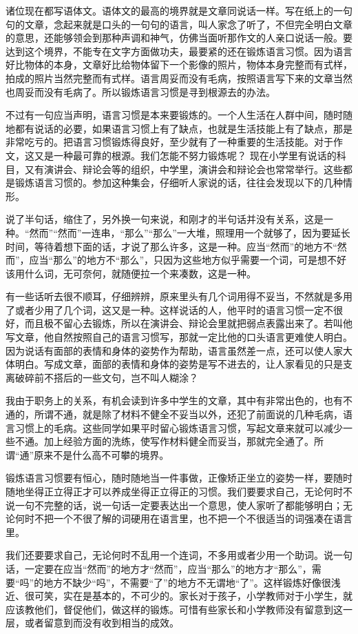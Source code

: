 \documentclass[fontset=fandol,12pt,a5paper]{ctexbook}
\begin{document}
诸位现在都写语体文。语体文的最高的境界就是文章同说话一样。写在纸上的一句句的文章，念起来就是口头的一句句的语言，叫人家念了听了，不但完全明白文章的意思，还能够领会到那种声调和神气，仿佛当面听那作文的人亲口说话一般。要达到这个境界，不能专在文字方面做功夫，最要紧的还在锻炼语言习惯。因为语言好比物体的本身，文章好比给物体留下一个影像的照片，物体本身完整而有式样，拍成的照片当然完整而有式样。语言周妥而没有毛病，按照语言写下来的文章当然也周妥而没有毛病了。所以锻炼语言习惯是寻到根源去的办法。

不过有一句应当声明，语言习惯是本来要锻炼的。一个人生活在人群中间，随时随地都有说话的必要，如果语言习惯上有了缺点，也就是生活技能上有了缺点，那是非常吃亏的。把语言习惯锻炼得良好，至少就有了一种重要的生活技能。对于作文，这又是一种最可靠的根源。我们怎能不努力锻炼呢？
现在小学里有说话的科目，又有演讲会、辩论会等的组织，中学里，演讲会和辩论会也常常举行。这些都是锻炼语言习惯的。参加这种集会，仔细听人家说的话，往往会发现以下的几种情形。

说了半句话，缩住了，另外换一句来说，和刚才的半句话并没有关系，这是一种。“然而”“然而”一连串，“那么”“那么”一大堆，照理用一个就够了，因为要延长时间，等待着想下面的话，才说了那么许多，这是一种。应当“然而”的地方不“然而”，应当“那么”的地方不“那么”，只因为这些地方似乎需要一个词，可是想不好该用什么词，无可奈何，就随便拉一个来凑数，这是一种。

有一些话听去很不顺耳，仔细辨辨，原来里头有几个词用得不妥当，不然就是多用了或者少用了几个词，这又是一种。这样说话的人，他平时的语言习惯一定不很好，而且极不留心去锻炼，所以在演讲会、辩论会里就把弱点表露出来了。若叫他写文章，他自然按照自己的语言习惯写，那就一定比他的口头语言更难使人明白。因为说话有面部的表情和身体的姿势作为帮助，语言虽然差一点，还可以使人家大体明白。写成文章，面部的表情和身体的姿势是写不进去的，让人家看见的只是支离破碎前不搭后的一些文句，岂不叫人糊涂？

我由于职务上的关系，有机会读到许多中学生的文章，其中有非常出色的，也有不通的，所谓不通，就是除了材料不健全不妥当以外，还犯了前面说的几种毛病，语言习惯上的毛病。这些同学如果平时留心锻炼语言习惯，写起文章来就可以减少一些不通。加上经验方面的洗练，使写作材料健全而妥当，那就完全通了。所谓“通”原来不是什么高不可攀的境界。

锻炼语言习惯要有恒心，随时随地当一件事做，正像矫正坐立的姿势一样，要随时随地坐得正立得正才可以养成坐得正立得正的习惯。我们要要求自己，无论何时不说一句不完整的话，说一句话一定要表达出一个意思，使人家听了都能够明白；无论何时不把一个不很了解的词硬用在语言里，也不把一个不很适当的词强凑在语言里。

我们还要要求自己，无论何时不乱用一个连词，不多用或者少用一个助词。说一句话，一定要在应当“然而”的地方才“然而”，应当“那么”的地方才“那么”，需要“吗”的地方不缺少“吗”，不需要“了”的地方不无谓地“了”。这样锻炼好像很浅近、很可笑，实在是基本的，不可少的。家长对于孩子，小学教师对于小学生，就应该教他们，督促他们，做这样的锻炼。可惜有些家长和小学教师没有留意到这一层，或者留意到而没有收到相当的成效。
\end{document}
